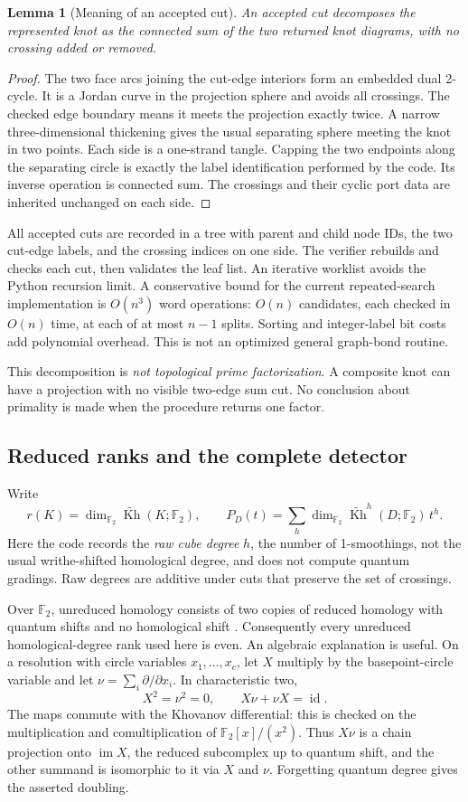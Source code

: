 \documentclass[11pt,a4paper]{article}
\newtheorem{lemma}[theorem]{Lemma}
\theoremstyle{definition}\newtheorem{remark}[theorem]{Remark}
\newcommand{\F}{\mathbb F_2}
\newcommand{\rKh}{\widetilde{\operatorname{Kh}}}
\newcommand{\id}{\operatorname{id}}
\begin{document}
\begin{lemma}[Meaning of an accepted cut]
An accepted cut decomposes the represented knot as the connected sum of the two
returned knot diagrams, with no crossing added or removed.
\end{lemma}
\begin{proof}
The two face arcs joining the cut-edge interiors form an embedded dual 2-cycle.
It is a Jordan curve in the projection sphere and avoids all crossings. The
checked edge boundary means it meets the projection exactly twice. A narrow
three-dimensional thickening gives the usual separating sphere meeting the knot
in two points. Each side is a one-strand tangle. Capping the two endpoints along
the separating circle is exactly the label identification performed by the code.
Its inverse operation is connected sum. The crossings and their cyclic port data
are inherited unchanged on each side.
\end{proof}

All accepted cuts are recorded in a tree with parent and child node IDs, the two
cut-edge labels, and the crossing indices on one side. The verifier rebuilds and
checks each cut, then validates the leaf list. An iterative worklist avoids the
Python recursion limit. A conservative bound for the current repeated-search
implementation is $O(n^3)$ word operations: $O(n)$ candidates, each checked in
$O(n)$ time, at each of at most $n-1$ splits. Sorting and integer-label bit costs
add polynomial overhead. This is not an optimized general graph-bond routine.

This decomposition is \emph{not topological prime factorization}. A composite
knot can have a projection with no visible two-edge sum cut. No conclusion about
primality is made when the procedure returns one factor.

\subsection{Reduced ranks and the complete detector}
\label{sec:rank}
Write
\[
r(K)=\dim_{\F}\rKh(K;\F),\qquad
P_D(t)=\sum_h\dim_{\F}\rKh^h(D;\F)\,t^h.
\]
Here the code records the \emph{raw cube degree} $h$, the number of 1-smoothings,
not the usual writhe-shifted homological degree, and does not compute quantum
gradings. Raw degrees are additive under cuts that preserve the set of crossings.

Over $\F$, unreduced homology consists of two copies of reduced homology with
quantum shifts and no homological shift \cite[Corollary 3.2.C]{Shumakovitch}.
Consequently every unreduced homological-degree rank used here is even.
An algebraic explanation is useful. On a resolution with circle variables
$x_1,\ldots,x_c$, let $X$ multiply by the basepoint-circle variable and let
$\nu=\sum_i\partial/\partial x_i$. In characteristic two,
\[
X^2=\nu^2=0,\qquad X\nu+\nu X=\id.
\]
The maps commute with the Khovanov differential: this is checked on the
multiplication and comultiplication of $\F[x]/(x^2)$. Thus $X\nu$ is a chain
projection onto $\operatorname{im}X$, the reduced subcomplex up to quantum shift,
and the other summand is isomorphic to it via $X$ and $\nu$. Forgetting quantum
degree gives the asserted doubling.
\end{document}
